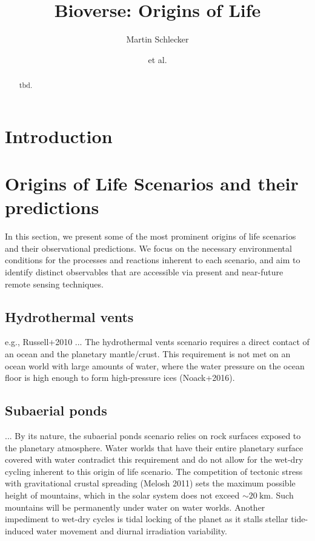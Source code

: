 \documentclass[twocolumn]{aastex631}
\begin{document}
\title{Bioverse: Origins of Life}

\author{Martin Schlecker}
\author{et al.}

\begin{abstract}
    tbd.
\end{abstract}

\section{Introduction}
\label{sec:intro}

\section{Origins of Life Scenarios and their predictions}
\label{sec:ool_scenarios}
In this section, we present some of the most prominent origins of life scenarios and their observational predictions.
We focus on the necessary environmental conditions for the processes and reactions inherent to each scenario, and aim to identify distinct observables that are accessible via present and near-future remote sensing techniques.

\subsection{Hydrothermal vents}
e.g., Russell+2010
...
The hydrothermal vents scenario requires a direct contact of an ocean and the planetary mantle/crust.
This requirement is not met on an ocean world with large amounts of water, where the water pressure on the ocean floor is high enough to form high-pressure ices (Noack+2016).

\subsection{Subaerial ponds}
...
By its nature, the subaerial ponds scenario relies on rock surfaces exposed to the planetary atmosphere.
Water worlds that have their entire planetary surface covered with water contradict this requirement and do not allow for the wet-dry cycling inherent to this origin of life scenario.
The competition of tectonic stress with gravitational crustal spreading (Melosh 2011) sets the maximum possible height of mountains, which in the solar system does not exceed $\sim \SI{20}{\kilo\meter}$.
Such mountains will be permanently under water on water worlds.
Another impediment to wet-dry cycles is tidal locking of the planet as it stalls stellar tide-induced water movement and diurnal irradiation variability.
\end{document}
